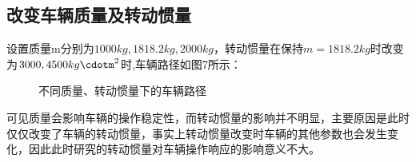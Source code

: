 \subsection{改变车辆质量及转动惯量}
设置质量m分别为$1000kg,1818.2kg,2000kg$，转动惯量在保持$m=1818.2kg$时改变为$3000,4500kg\cdotm^2$时,车辆路径如图7所示：
\begin{figure}[htbp]
    \centering
    \caption{不同质量、转动惯量下的车辆路径}
    \label{massIz}
\end{figure}

可见质量会影响车辆的操作稳定性，而转动惯量的影响并不明显，主要原因是此时仅仅改变了车辆的转动惯量，事实上转动惯量改变时车辆的其他参数也会发生变化，因此此时研究的转动惯量对车辆操作响应的影响意义不大。

